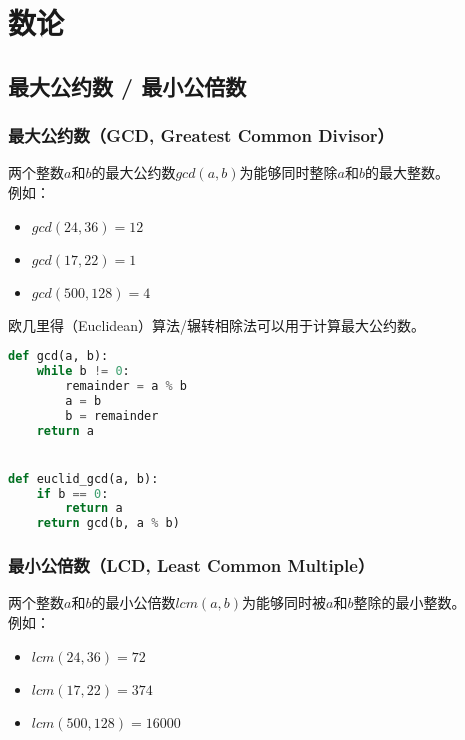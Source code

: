 \chapter{数论}

\section{最大公约数 / 最小公倍数}

\subsection{最大公约数（GCD, Greatest Common Divisor）}

两个整数$ a $和$ b $的最大公约数$ gcd(a, b) $为能够同时整除$ a $和$ b $的最大整数。\\

例如：

\begin{itemize}
    \item $ gcd(24, 36) = 12 $
    \item $ gcd(17, 22) = 1 $
    \item $ gcd(500, 128) = 4 $
\end{itemize}

欧几里得（Euclidean）算法/辗转相除法可以用于计算最大公约数。\\


\begin{lstlisting}[language=Python]
def gcd(a, b):
    while b != 0:
        remainder = a % b
        a = b
        b = remainder
    return a


def euclid_gcd(a, b):
    if b == 0:
        return a
    return gcd(b, a % b)
\end{lstlisting}

\vspace{0.5cm}

\subsection{最小公倍数（LCD, Least Common Multiple）}

两个整数$ a $和$ b $的最小公倍数$ lcm(a, b) $为能够同时被$ a $和$ b $整除的最小整数。\\

例如：

\begin{itemize}
    \item $ lcm(24, 36) = 72 $
    \item $ lcm(17, 22) = 374 $
    \item $ lcm(500, 128) = 16000 $
\end{itemize}

